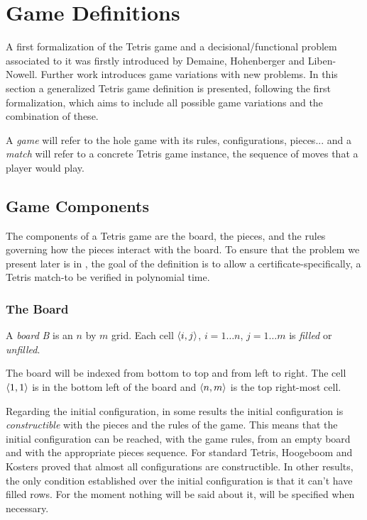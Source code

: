 \chapter{Game Definitions}

A first formalization of the Tetris game and a decisional/functional problem associated to it was firstly introduced by Demaine, Hohenberger and Liben-Nowell\cite{TIH}. Further work\cite{TT,TWFP,TCB,CTV,CTV} introduces game variations with new problems. In this section a generalized Tetris game definition is presented, following the first formalization, which aims to include all possible game variations and the combination of these. 

A \emph{game} will refer to the hole game with its rules, configurations, pieces... and a \emph{match} will refer to a concrete Tetris game instance, the sequence of moves that a player would play.


\section{Game Components}

The components of a Tetris game are the board, the pieces, and the rules governing how the pieces interact with the board. To ensure that the problem we present later is in \np, the goal of the definition is to allow a certificate-specifically, a Tetris match-to be verified in polynomial time. 

\subsection{The Board}


\begin{definition} 
  A \emph{board} \emph{B} is an $n$ by $m$ grid. Each cell $\cell$, $i = 1\dots n$, $j = 1\dots m$ is \emph{filled} or \emph{unfilled}.
\end{definition}

The board will be indexed from bottom to top and from left to right. The cell $\cell[1][1]$ is in the bottom left of the board and $\cell[n][m]$ is the top right-most cell. 

Regarding the initial configuration, in some results\cite{TT, } the initial configuration is \emph{constructible} with the pieces and the rules of the game. This means that the initial configuration can be reached, with the game rules, from an empty board and with the appropriate pieces sequence. For standard Tetris, Hoogeboom and Kosters proved that almost all configurations are constructible\cite{HCTC}. In other results\cite{TIH, TWFP, TWCB}, the only condition established over the initial configuration is that it can't have filled rows. For the moment nothing will be said about it, will be specified when necessary.

